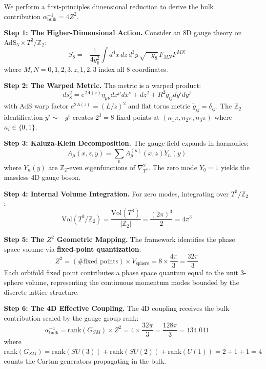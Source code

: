 \documentclass[12pt,a4paper]{article}
\newcommand{\Ztwo}{\mathbb{Z}_2}
\newcommand{\Tthree}{T^3}
\newcommand{\Zsq}{Z^2}
\begin{document}
We perform a first-principles dimensional reduction to derive the bulk contribution $\alpha_{\text{bulk}}^{-1} = 4\Zsq$.

\textbf{Step 1: The Higher-Dimensional Action.}
Consider an 8D gauge theory on AdS$_5 \times \Tthree/\Ztwo$:
\begin{equation}
S_8 = -\frac{1}{4g_8^2} \int d^4x\, dz\, d^3y\, \sqrt{-g_8}\, F_{MN}F^{MN}
\end{equation}
where $M, N = 0,1,2,3,z,1,2,3$ index all 8 coordinates.

\textbf{Step 2: The Warped Metric.}
The metric is a warped product:
\begin{equation}
ds_8^2 = e^{2A(z)} \eta_{\mu\nu} dx^\mu dx^\nu + dz^2 + R^2 \tilde{g}_{ij} dy^i dy^j
\end{equation}
with AdS warp factor $e^{2A(z)} = (L/z)^2$ and flat torus metric $\tilde{g}_{ij} = \delta_{ij}$. The $\Ztwo$ identification $y^i \sim -y^i$ creates $2^3 = 8$ fixed points at $(n_1\pi, n_2\pi, n_3\pi)$ where $n_i \in \{0,1\}$.

\textbf{Step 3: Kaluza-Klein Decomposition.}
The gauge field expands in harmonics:
\begin{equation}
A_\mu(x,z,y) = \sum_n A_\mu^{(n)}(x,z) Y_n(y)
\end{equation}
where $Y_n(y)$ are $\Ztwo$-even eigenfunctions of $\nabla^2_{T^3}$. The zero mode $Y_0 = 1$ yields the massless 4D gauge boson.

\textbf{Step 4: Internal Volume Integration.}
For zero modes, integrating over $\Tthree/\Ztwo$:
\begin{equation}
\text{Vol}(\Tthree/\Ztwo) = \frac{\text{Vol}(T^3)}{|\Ztwo|} = \frac{(2\pi)^3}{2} = 4\pi^3
\end{equation}

\textbf{Step 5: The $\Zsq$ Geometric Mapping.}
The framework identifies the phase space volume via \textbf{fixed-point quantization}:
\begin{equation}
\Zsq = (\text{\# fixed points}) \times V_{\text{sphere}} = 8 \times \frac{4\pi}{3} = \frac{32\pi}{3}
\end{equation}
Each orbifold fixed point contributes a phase space quantum equal to the unit 3-sphere volume, representing the continuous momentum modes bounded by the discrete lattice structure.

\textbf{Step 6: The 4D Effective Coupling.}
The 4D coupling receives the bulk contribution scaled by the gauge group rank:
\begin{equation}
\alpha_{\text{bulk}}^{-1} = \text{rank}(G_{SM}) \times \Zsq = 4 \times \frac{32\pi}{3} = \frac{128\pi}{3} = 134.041
\end{equation}
where $\text{rank}(G_{SM}) = \text{rank}(SU(3)) + \text{rank}(SU(2)) + \text{rank}(U(1)) = 2 + 1 + 1 = 4$ counts the Cartan generators propagating in the bulk.
\end{document}
